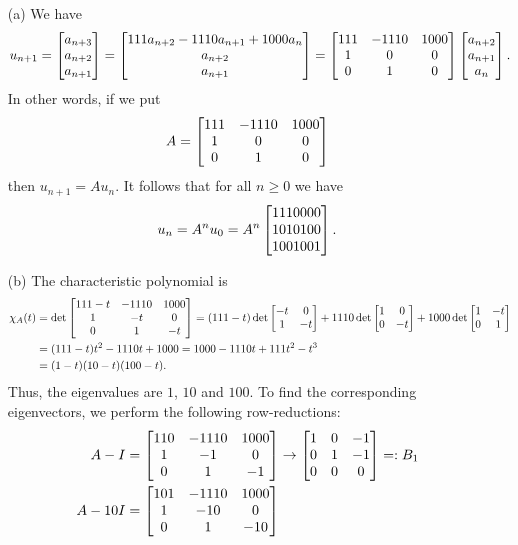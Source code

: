 \documentclass[a4paper]{amsart}
\renewenvironment{solution}{\SolutionInline}{\endSolutionInline}
\begin{document}
\begin{solution}
 \begin{itemize}
  \item[(a)] We have
   \[ u_{n+1} = 
      \left[\begin{matrix} a_{n+3} \\ a_{n+2} \\ a_{n+1} \end{matrix}\right] = 
      \left[\begin{matrix} 111 a_{n+2} - 1110 a_{n+1} + 1000 a_n \\ a_{n+2} \\ a_{n+1} \end{matrix}\right] = 
      \left[\begin{matrix} 111 & -1110 & 1000 \\ 1 & 0 & 0 \\ 0 & 1 & 0 \end{matrix}\right] 
       \left[\begin{matrix} a_{n+2} \\ a_{n+1} \\ a_n \end{matrix}\right].
   \]
   In other words, if we put 
   \[ A = \left[\begin{matrix} 111 & -1110 & 1000 \\ 1 & 0 & 0 \\ 0 & 1 & 0 \end{matrix}\right]  \]
   then $u_{n+1}=Au_n$.  It follows that for all $n\geq 0$ we have
   \[ u_n = A^nu_0 = A^n\left[\begin{matrix} 1110000 \\ 1010100 \\ 1001001\end{matrix}\right]. \]
  \item[(b)] The characteristic polynomial is 
   \begin{align*}
    \chi_A(t)
     &= \det\left[\begin{matrix} 111-t & -1110 & 1000 \\ 1 & -t & 0 \\ 0 & 1 & -t \end{matrix}\right]
      = (111-t) \det\left[\begin{matrix} -t & 0 \\ 1 & -t \end{matrix}\right] 
        +1110 \det\left[\begin{matrix} 1 & 0 \\ 0 & -t \end{matrix}\right] 
        +1000 \det\left[\begin{matrix} 1 & -t \\ 0 & 1\end{matrix}\right] \\
     &= (111-t)t^2 -1110t + 1000 
      = 1000 - 1110t + 111t^2 - t^3 \\
     &= (1-t)(10-t)(100-t).
   \end{align*}
   Thus, the eigenvalues are $1$, $10$ and $100$.  To find the
   corresponding eigenvectors, we perform the following
   row-reductions:
   \begin{align*}
    A-I    &= \bbm 110 & -1110 & 1000 \\ 1 & -1 & 0 \\ 0 & 1 & -1 \ebm 
            \to \bbm 1 & 0 & -1 \\ 0 & 1 & -1 \\ 0 & 0 & 0 \ebm =: B_1 \\
    A-10I  &= \bbm 101 & -1110 & 1000 \\ 1 & -10 & 0 \\ 0 & 1 & -10 \ebm 

\end{align*}
\end{itemize}
\end{solution}
\end{document}
